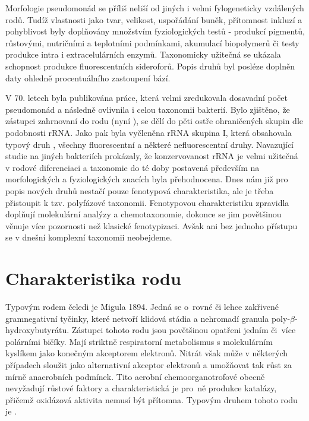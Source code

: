 Morfologie pseudomonád se příliš neliší od jiných i velmi fylogeneticky vzdálených rodů.
Tudíž vlastnosti jako tvar, velikost, uspořádání buněk, přítomnost inkluzí a pohyblivost byly doplňovány množstvím fyziologických testů - produkcí pigmentů, růstovými, nutričními a teplotními podmínkami, akumulací biopolymerů či testy produkce intra i extracelulárních enzymů.
Taxonomicky užitečná se ukázala schopnost produkce fluorescentních sideroforů.
Popis druhů byl posléze doplněn daty ohledně procentuálního zastoupení bází. \cite{cornelis2008pseudomonas, palleroni2010pseudomonas}

V 70. letech byla publikována práce, která velmi zredukovala dosavadní počet pseudomonád a následně ovlivnila i celou taxonomii bakterií. \cite{palleroni1973nucleic, frey1997molecular, clarridge2004impact, larsen2014benchmarking}
Bylo zjištěno, že zástupci zahrnovaní do rodu  (nyní ), se dělí do pěti ostře ohraničených skupin dle podobnosti rRNA.
Jako  pak byla vyčleněna rRNA skupina I, která obsahovala typový druh , všechny fluorescentní a některé nefluorescentní druhy.
Navazující studie na jiných bakteriích prokázaly, že konzervovanost rRNA je velmi užitečná v rodové diferenciaci a taxonomie do té doby postavená především na morfologických a fyziologických znacích byla přehodnocena. \cite{ fox1977comparative, woese1980phylogenetic, ludwig1981phylogenetic}
Dnes nám již pro popis nových druhů nestačí pouze fenotypová charakteristika, ale je třeba přistoupit k tzv. polyfázové taxonomii. \cite{tindall2010notes, thompson2015microbial}
Fenotypovou charakteristiku zpravidla doplňují molekulární analýzy a chemotaxonomie, dokonce se jim povětšinou věnuje více pozornosti než klasické fenotypizaci.
Avšak ani bez jednoho přístupu se v dnešní komplexní taxonomii neobejdeme. \cite{palleroni1973nucleic, palleroni2010pseudomonas}

\section{Charakteristika rodu }
Typovým rodem čeledi  je  Migula 1894.
Jedná se o~rovné či lehce zakřivené gramnegativní tyčinky, které netvoří klidová stádia a nehromadí granula poly-$\beta$-hydroxybutyrátu.
Zástupci tohoto rodu jsou povětšinou opatřeni jedním či~více polárními bičíky.
Mají striktně respiratorní metabolismus s molekulárním kyslíkem jako konečným akceptorem elektronů.
Nitrát však může v některých případech sloužit jako alternativní akceptor elektronů a umožňovat tak růst za mírně anaerobních podmínek.
Tito aerobní chemoorganotrofové obecně nevyžadují růstové faktory a charakteristická je pro~ně produkce katalázy, přičemž oxidázová aktivita nemusí být přítomna.
Typovým druhem tohoto rodu je . \cite{garrity2005bergey}

